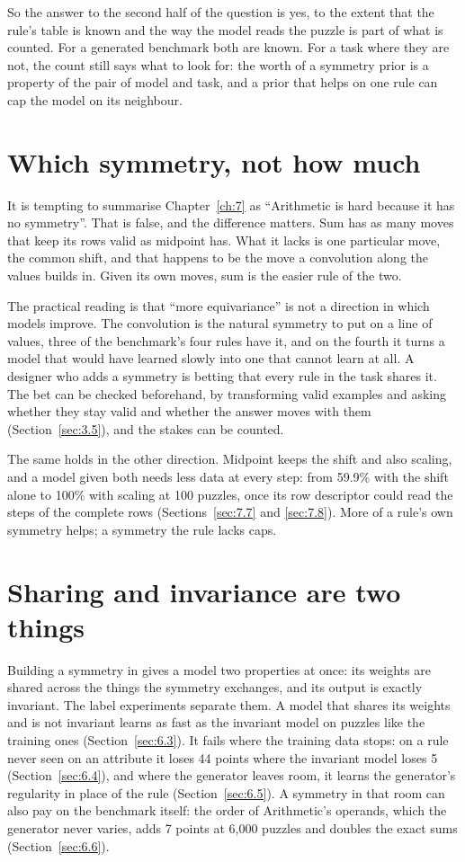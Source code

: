 So the answer to the second half of the question is yes, to the extent that the rule's table is known and the way the model reads the puzzle is part of what is counted. For a generated benchmark both are known. For a task where they are not, the count still says what to look for: the worth of a symmetry prior is a property of the pair of model and task, and a prior that helps on one rule can cap the model on its neighbour.

\section{Which symmetry, not how much}\label{sec:8.2}

It is tempting to summarise Chapter~\ref{ch:7} as ``Arithmetic is hard because it has no symmetry''. That is false, and the difference matters. Sum has as many moves that keep its rows valid as midpoint has. What it lacks is one particular move, the common shift, and that happens to be the move a convolution along the values builds in. Given its own moves, sum is the easier rule of the two.

The practical reading is that ``more equivariance'' is not a direction in which models improve. The convolution is the natural symmetry to put on a line of values, three of the benchmark's four rules have it, and on the fourth it turns a model that would have learned slowly into one that cannot learn at all. A designer who adds a symmetry is betting that every rule in the task shares it. The bet can be checked beforehand, by transforming valid examples and asking whether they stay valid and whether the answer moves with them (Section~\ref{sec:3.5}), and the stakes can be counted.

The same holds in the other direction. Midpoint keeps the shift and also scaling, and a model given both needs less data at every step: from 59.9\% with the shift alone to 100\% with scaling at 100 puzzles, once its row descriptor could read the steps of the complete rows (Sections~\ref{sec:7.7} and \ref{sec:7.8}). More of a rule's own symmetry helps; a symmetry the rule lacks caps.

\section{Sharing and invariance are two things}\label{sec:8.3}

Building a symmetry in gives a model two properties at once: its weights are shared across the things the symmetry exchanges, and its output is exactly invariant. The label experiments separate them. A model that shares its weights and is not invariant learns as fast as the invariant model on puzzles like the training ones (Section~\ref{sec:6.3}). It fails where the training data stops: on a rule never seen on an attribute it loses 44 points where the invariant model loses 5 (Section~\ref{sec:6.4}), and where the generator leaves room, it learns the generator's regularity in place of the rule (Section~\ref{sec:6.5}). A symmetry in that room can also pay on the benchmark itself: the order of Arithmetic's operands, which the generator never varies, adds 7 points at 6,000 puzzles and doubles the exact sums (Section~\ref{sec:6.6}).

